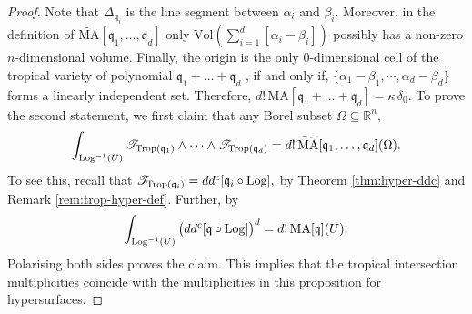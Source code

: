 \documentclass[11pt]{amsart}
\def\Log{{\rm Log}}
\theoremstyle{definition}
\newcommand{\R}{\mathbb{R}}
\newcommand{\sT}{\mathscr{T}}
\newcommand{\fq}{\mathfrak{q}}
\newcommand{\Trop}{\mathrm{Trop}}
\begin{document}
\begin{proof}
 Note that $\Delta_{\fq_i} $ is the line segment between $\alpha_i$ and $\beta_i.$ Moreover, in the definition of 
 $\widetilde{\text{MA}}[\fq_1, \dots , \fq_d]$ only $\textrm{Vol}( \sum_{i=1}^d [\alpha_i - \beta_i])$ possibly has a non-zero $n$-dimensional volume.  Finally, the origin is the only $0$-dimensional cell of the tropical variety of polynomial $\fq_1 + \dots + \fq_d$ , if and only if, $\{\alpha_1-\beta_1, \cdots ,  \alpha_d-\beta_d\}$ forms a linearly independent set.  Therefore, $d! \, \textrm{MA}[\fq_1 + \dots + \fq_d]= \kappa \, \delta_{0}.$ To prove the second statement, we first claim that any Borel subset $\Omega \subseteq \R^n,$ 
 $$
 \int_{\Log^{-1}(U)} \sT_{\Trop(\fq_1)} \wedge \dots \wedge  \sT_{\Trop(\fq_d)}= d! \, \widetilde{\text{MA}}[\fq_1, \dots , \fq_d ](\Omega).
 $$
 To see this, recall that ${\sT_{\Trop(\fq_i)}} = dd^c [\fq_i \circ \Log],$ by Theorem \ref{thm:hyper-ddc} and Remark \ref{rem:trop-hyper-def}. Further, by \cite{Rash}
 $$
\int_{\Log^{-1}(U)} \big(dd^c [\fq \circ \Log]\big)^d =  d! \, {\text{MA}}[\fq] (U).
 $$
 Polarising both sides proves the claim. This implies that the tropical intersection multiplicities coincide with the multiplicities in this proposition for hypersurfaces. 
\end{proof}








 
\end{document}
